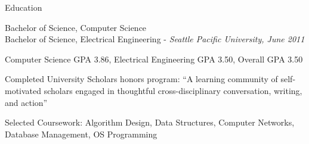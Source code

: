 \documentclass[letterpaper,10pt]{article}
\newenvironment{res_section}[1]{%
  \vskip 6pt
  \noindent
  {\Large \textbf{#1}}\\
  \rule[8pt]{\textwidth}{0.5pt}
  \vskip -8pt
}{
}
\newenvironment{res_subsection}[1]{%
  \vskip 4pt
  \noindent
  \textbf{\large{#1}}
  \begin{itemize}
}{
  \end{itemize}
}
\begin{document}
\begin{res_section}{Education}
\begin{res_subsection}{Bachelor of Science, Computer Science\\
Bachelor of Science, Electrical Engineering - \em{Seattle Pacific University, June 2011}
}
  \item Computer Science GPA 3.86, Electrical Engineering GPA 3.50, Overall GPA 3.50
  \item Completed University Scholars honors program: ``A learning community of self-motivated scholars engaged in thoughtful cross-disciplinary conversation, writing, and action''
  \item Selected Coursework: Algorithm Design, Data Structures, Computer Networks, Database Management, OS Programming
\end{res_subsection}
\end{res_section}
\end{document}
